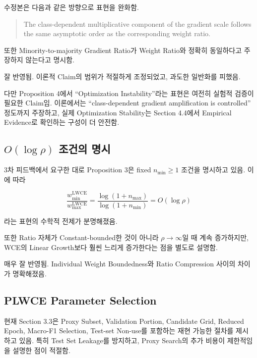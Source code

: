 \documentclass[11pt,a4paper]{article}
\begin{document}
수정본은 다음과 같은 방향으로 표현을 완화함.

\begin{quote}
The class-dependent multiplicative component of the gradient scale follows the same asymptotic order as the corresponding weight ratio.
\end{quote}

또한 Minority-to-majority Gradient Ratio가 Weight Ratio와 정확히 동일하다고 주장하지 않는다고 명시함.

\begin{tcolorbox}[title=반영 평가]
잘 반영됨. 이론적 Claim의 범위가 적절하게 조정되었고, 과도한 일반화를 피했음.
\end{tcolorbox}

다만 Proposition 4에서 ``Optimization Instability''라는 표현은 여전히 실험적 검증이 필요한 Claim임. 이론에서는 ``class-dependent gradient amplification is controlled'' 정도까지 주장하고, 실제 Optimization Stability는 Section 4.4에서 Empirical Evidence로 확인하는 구성이 더 안전함.

\subsection{\(O(\log \rho)\) 조건의 명시}

3차 피드백에서 요구한 대로 Proposition 3은 fixed \(n_{\min}\geq 1\) 조건을 명시하고 있음. 이에 따라

\[
\frac{w_{\min}^{\mathrm{LWCE}}}{w_{\max}^{\mathrm{LWCE}}}
=
\frac{\log(1+n_{\max})}{\log(1+n_{\min})}
=
O(\log \rho)
\]

라는 표현의 수학적 전제가 분명해졌음.

또한 Ratio 자체가 Constant-bounded한 것이 아니라 \(\rho\to\infty\)일 때 계속 증가하지만, WCE의 Linear Growth보다 훨씬 느리게 증가한다는 점을 별도로 설명함.

\begin{tcolorbox}[title=반영 평가]
매우 잘 반영됨. Individual Weight Boundedness와 Ratio Compression 사이의 차이가 명확해졌음.
\end{tcolorbox}

\subsection{PLWCE Parameter Selection}

현재 Section 3.3은 Proxy Subset, Validation Portion, Candidate Grid, Reduced Epoch, Macro-F1 Selection, Test-set Non-use를 포함하는 재현 가능한 절차를 제시하고 있음. 특히 Test Set Leakage를 방지하고, Proxy Search의 추가 비용이 제한적임을 설명한 점이 적절함.
\end{document}
